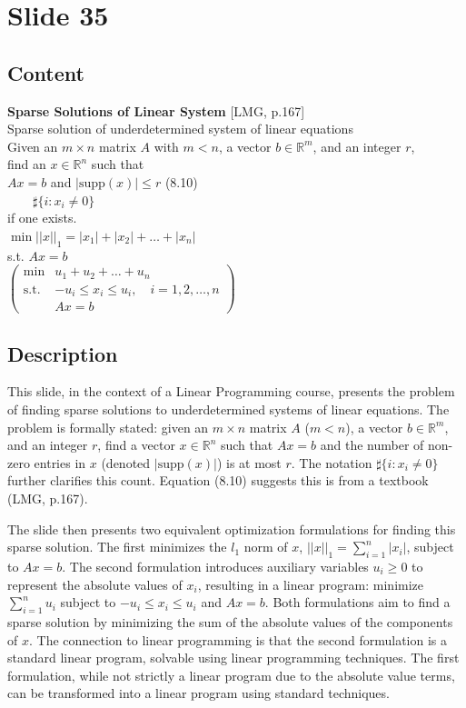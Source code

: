 \documentclass{article}%
\begin{document}
%
\newpage%
\section{Slide 35}%
\label{sec:Slide35}%
\subsection{Content}%

\textbf{Sparse Solutions of Linear System} [LMG, p.167] \\
Sparse solution of underdetermined system of linear equations \\
Given an $m \times n$ matrix $A$ with $m < n$, a vector $b \in \mathbb{R}^m$, and an integer $r$, \\
find an $x \in \mathbb{R}^n$ such that \\
$Ax = b$ and $|\text{supp}(x)| \le r$ \quad (8.10) \\
$\qquad \sharp \{ i : x_i \ne 0 \}$ \\
if one exists. \\
$\min ||x||_1 = |x_1| + |x_2| + \dots + |x_n|$ \\
s.t. $Ax = b$ \\
$\begin{pmatrix}
\min & u_1 + u_2 + \dots + u_n \\
\text{s.t.} & -u_i \le x_i \le u_i, \quad i = 1, 2, \dots, n \\
& Ax = b
\end{pmatrix}$
%
\subsection{Description}%
This slide, in the context of a Linear Programming course, presents the problem of finding sparse solutions to underdetermined systems of linear equations.  The problem is formally stated: given an $m \times n$ matrix $A$ ($m < n$), a vector $b \in \mathbb{R}^m$, and an integer $r$, find a vector $x \in \mathbb{R}^n$ such that $Ax = b$ and the number of non-zero entries in $x$ (denoted $|\text{supp}(x)|$) is at most $r$.  The notation $\sharp \{ i : x_i \ne 0 \}$ further clarifies this count. Equation (8.10) suggests this is from a textbook (LMG, p.167).

The slide then presents two equivalent optimization formulations for finding this sparse solution. The first minimizes the $l_1$ norm of $x$,  $||x||_1 = \sum_{i=1}^n |x_i|$, subject to $Ax = b$.  The second formulation introduces auxiliary variables $u_i \ge 0$ to represent the absolute values of $x_i$, resulting in a linear program: minimize $\sum_{i=1}^n u_i$ subject to $-u_i \le x_i \le u_i$ and $Ax = b$.  Both formulations aim to find a sparse solution by minimizing the sum of the absolute values of the components of $x$.  The connection to linear programming is that the second formulation is a standard linear program, solvable using linear programming techniques.  The first formulation, while not strictly a linear program due to the absolute value terms, can be transformed into a linear program using standard techniques.%
\end{document}

